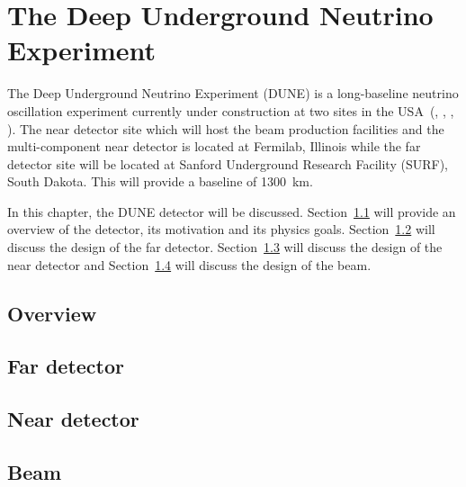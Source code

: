 \chapter{The Deep Underground Neutrino Experiment}
\label{ch:dune}

The Deep Underground Neutrino Experiment (DUNE) is a long-baseline neutrino oscillation experiment currently under construction at two sites in the USA~(\cite{tdrVol1}, \cite{tdrVol2}, \cite{tdrVol3}, \cite{tdrVol4}).
The near detector site which will host the beam production facilities and the multi-component near detector is located at Fermilab, Illinois while the far detector site will be located at Sanford Underground Research Facility (SURF), South Dakota.
This will provide a baseline of 1300~km.

In this chapter, the DUNE detector will be discussed.
Section~\ref{sec:dune:overview} will provide an overview of the detector, its motivation and its physics goals.
Section~\ref{sec:dune:fd} will discuss the design of the far detector.
Section~\ref{sec:dune:nd} will discuss the design of the near detector and Section~\ref{sec:dune:beam} will discuss the design of the beam.

\section{Overview}
\label{sec:dune:overview}

\section{Far detector}
\label{sec:dune:fd}

\blindtext

\section{Near detector}
\label{sec:dune:nd}

\blindtext

\section{Beam}
\label{sec:dune:beam}

\blindtext
